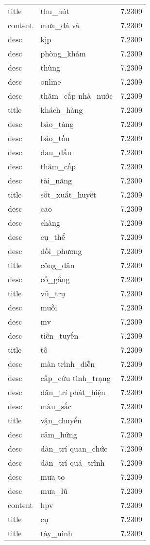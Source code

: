 \documentclass{article}
\begin{document}
\begin{tabular}{lll}
title & thu\_hút & 7.2309\\
content & mưa\_đá và & 7.2309\\
desc & kịp & 7.2309\\
desc & phòng\_khám & 7.2309\\
desc & thùng & 7.2309\\
desc & online & 7.2309\\
desc & thăm\_cấp nhà\_nước & 7.2309\\
title & khách\_hàng & 7.2309\\
desc & bảo\_tàng & 7.2309\\
desc & bảo\_tồn & 7.2309\\
desc & đau\_đầu & 7.2309\\
desc & thăm\_cấp & 7.2309\\
desc & tài\_năng & 7.2309\\
title & sốt\_xuất\_huyết & 7.2309\\
desc & cao & 7.2309\\
desc & chàng & 7.2309\\
desc & cụ\_thể & 7.2309\\
desc & đối\_phương & 7.2309\\
title & công\_dân & 7.2309\\
desc & cố\_gắng & 7.2309\\
title & vũ\_trụ & 7.2309\\
desc & muỗi & 7.2309\\
desc & mv & 7.2309\\
desc & tiền\_tuyến & 7.2309\\
title & tô & 7.2309\\
desc & màn trình\_diễn & 7.2309\\
desc & cấp\_cứu tình\_trạng & 7.2309\\
desc & dân\_trí phát\_hiện & 7.2309\\
desc & màu\_sắc & 7.2309\\
title & vận\_chuyển & 7.2309\\
desc & cảm\_hứng & 7.2309\\
desc & dân\_trí quan\_chức & 7.2309\\
desc & dân\_trí quá\_trình & 7.2309\\
desc & mưa to & 7.2309\\
desc & mưa\_lũ & 7.2309\\
content & hpv & 7.2309\\
title & cụ & 7.2309\\
title & tây\_ninh & 7.2309\\

\end{tabular}
\end{document}
